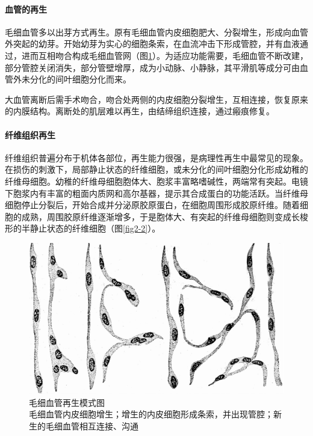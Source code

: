 \paragraph{血管的再生}
毛细血管多以出芽方式再生。原有毛细血管内皮细胞肥大、分裂增生，形成向血管外突起的幼芽。开始幼芽为实心的细胞条索，在血流冲击下形成管腔，并有血液通过，进而互相吻合构成毛细血管网（图\ref{fig2-1}）。为适应功能需要，毛细血管不断改建，部分管腔关闭消失，部分管壁增厚，成为小动脉、小静脉，其平滑肌等成分可由血管外未分化的间叶细胞分化而来。

大血管离断后需手术吻合，吻合处两侧的内皮细胞分裂增生，互相连接，恢复原来的内膜结构。离断处的肌层难以再生，由结缔组织连接，通过瘢痕修复。

\paragraph{纤维组织再生}
纤维组织普遍分布于机体各部位，再生能力很强，是病理性再生中最常见的现象。在损伤的刺激下，局部静止状态的纤维细胞，或未分化的间叶细胞分化形成幼稚的纤维母细胞。幼稚的纤维母细胞胞体大、胞浆丰富略嗜碱性，两端常有突起。电镜下胞浆内有丰富的粗面内质网和高尔基器，提示其合成蛋白的功能活跃。当纤维母细胞停止分裂后，开始合成并分泌原胶原蛋白，在细胞周围形成胶原纤维。随着细胞的成熟，周围胶原纤维逐渐增多，于是胞体大、有突起的纤维母细胞则变成长梭形的半静止状态的纤维细胞（图\ref{fig2-2}）。
\begin{figure}[!h]
	\begin{center}
		\includegraphics{./images/Image00024.jpg}
	\end{center}
	\captionsetup{justification=centering}
	\caption{毛细血管再生模式图 \\ {\small 毛细血管内皮细胞增生；增生的内皮细胞形成条索，并出现管腔；新生的毛细血管相互连接、沟通}}
	\label{fig2-1}
\end{figure}


